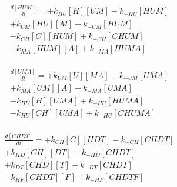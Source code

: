\begin{equation}
\begin{split}
\frac{d[HUM]}{dt} =   + k_{HU}[H][UM]  - k_{-HU}[HUM]     \\%
                      + k_{UM}[HU][M]  - k_{-UM}[HUM]     \\%
                      - k_{CH}[C][HUM] + k_{-CH}[CHUM]    \\%
                      - k_{MA}[HUM][A] + k_{-MA}[HUMA]    \\%
\end{split}
\end{equation}

\begin{equation}
\begin{split}
\frac{d[UMA]}{dt} =   + k_{UM}[U][MA]   - k_{-UM}[UMA]    \\%
                      + k_{MA}[UM][A]   - k_{-MA}[UMA]    \\%
                      - k_{HU}[H][UMA]  + k_{-HU}[HUMA]   \\%
                      - k_{HU}[CH][UMA] + k_{-HU}[CHUMA]  \\%
\end{split}
\end{equation}

\begin{equation}
\begin{split}
\frac{d[CHDT]}{dt} =  + k_{CH}[C][HDT] - k_{-CH}[CHDT]    \\%
                      + k_{HD}[CH][DT] - k_{-HD}[CHDT]    \\%
                      + k_{DT}[CHD][T] - k_{-DT}[CHDT]    \\%
                      - k_{HF}[CHDT][F] + k_{-HF}[CHDTF]  \\%
\end{split}
\end{equation}

